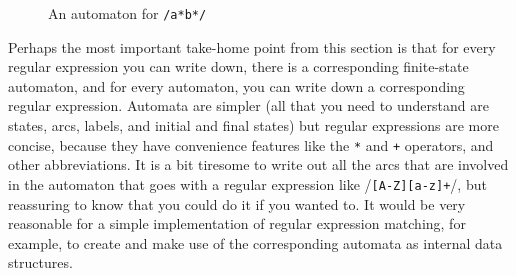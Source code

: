 \begin{underthehood}
\begin{figure}
    \caption{An automaton for \texttt{/a*b*/}}
    \label{finite:state:sixth}
\end{figure}

Perhaps the most important take-home point from this section is that
for every regular expression you can write down, there is a
corresponding finite-state automaton, and for every automaton, you can
write down a corresponding regular expression. Automata are simpler
(all that you need to understand are states, arcs, labels, and initial
and final states) but regular expressions are more concise, because
they have convenience features like the \texttt{*} and \texttt{+}
operators, and other abbreviations. It is a bit tiresome to write out
all the arcs that are involved in the automaton that goes with a
regular expression like /\texttt{[A-Z][a-z]+}/, but reassuring to know
that you could do it if you wanted to.  It would be very reasonable
for a simple implementation of regular expression matching, for
example, to create and make use of the corresponding automata as
internal data structures.

\end{underthehood}
